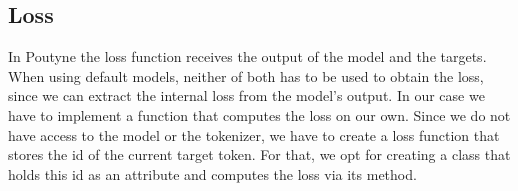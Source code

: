 \documentclass[letterpaper,10pt,english]{jupyterBook}
\begin{document}
\subsection{Loss}
\label{\detokenize{Poutyne:loss}}
\sphinxAtStartPar
In Poutyne the loss function receives the output of the model and the targets.
When using default models, neither of both has to be used to obtain the loss, since we can extract the internal loss from the model’s output.
In our case we have to implement a function that computes the loss on our own.
Since we do not have access to the model or the tokenizer, we have to create a loss function that stores the id of the current target token. For that, we opt for creating a class that holds this id as an attribute and computes the loss via its  method.
\begin{sphinxVerbatimInput}

\begin{sphinxVerbatim}[commandchars=\\\{\}]
 
      
          

         
          \PYG{p}{[}\PYG{p}{]}
          \PYG{p}{[}\PYG{p}{]}
          \PYG{p}{[}\PYG{p}{]}


\end{sphinxVerbatim}
\end{sphinxVerbatimInput}
\end{document}
